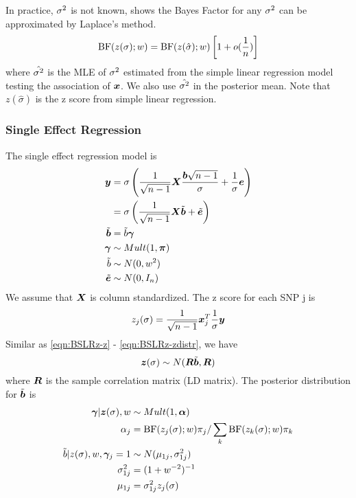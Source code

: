 In practice, $\sigma^2$ is not known, \cite{wen2014bayesian} shows the Bayes Factor for any $\sigma^2$ can be approximated by Laplace's method.
\begin{equation}
    \text{BF}(z(\sigma); w) =  \text{BF}(z(\hat{\sigma}); w) \left[1+o(\frac{1}{n})\right]
\end{equation}
where $\hat{\sigma^2}$ is the MLE of $\sigma^2$ estimated from the simple linear regression model testing the association of $\bm x$. We also use $\hat{\sigma^2}$ in the posterior mean. Note that $z(\hat{\sigma})$ is the z score from simple linear regression.

\subsubsection{Single Effect Regression}
The single effect regression model is
\begin{align}
\bm y &= \sigma\left( \frac{1}{\sqrt{n-1}} \bm X \frac{\bm b\sqrt{n-1}}{\sigma} + \frac {1}{\sigma} \bm e \right) \\
 &= \sigma\left( \frac{1}{\sqrt{n-1}} \bm X \tilde{\bm b} + \tilde{\bm e} \right) \label{eqn:SERz-y}\\
\tilde{\bm b} &= \tilde{b} \bm \gamma \\
\bm \gamma &\sim Mult(1, \bm \pi) \\
\tilde{b} &\sim N(0, w^2) \\
\tilde{\bm e} & \sim N(0,I_n) \label{eqn:SERz-e}
\end{align}
We assume that $\bm X$ is column standardized. The z score for each SNP j is
\begin{equation}\label{eqn:zj}
    z_j(\sigma) = \frac{1}{\sqrt{n-1}}\bm x_j^T \frac{1}{\sigma}\bm y
\end{equation}
Similar as \eqref{eqn:BSLRz-z} - \eqref{eqn:BSLRz-zdistr}, we have
\begin{equation} \label{eqn:serz}
    \bm{z}(\sigma) \sim N(\bm R \tilde{\bm b}, \bm R)
\end{equation}
where $\bm R$ is the sample correlation matrix (LD matrix). The posterior distribution for $\tilde{\bm b}$ is
\begin{align} \label{eqn:serz-postgamma}
    \bm \gamma | \bm{z}(\sigma), w &\sim Mult(1, \bm \alpha) \\
    \alpha_j &= \text{BF}(z_j(\sigma); w) \pi_j/\sum_k \text{BF}(z_k(\sigma); w) \pi_k \label{eqn:serz-postalpha}\\
    \tilde{b} | z(\sigma), w, \bm \gamma_j = 1 &\sim N(\mu_{1j}, \sigma^2_{1j}) \label{eqn:serz-postb}\\
    \sigma^2_{1j} &= (1 + w^{-2})^{-1} \label{eqn:serz-postsigma}\\
    \mu_{1j} &= \sigma^2_{1j} z_j(\sigma) \label{eqn:serz-postmu}
\end{align}
